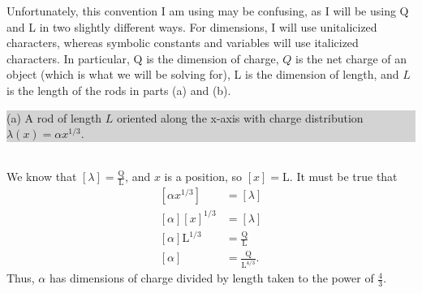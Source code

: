 \documentclass[]{article}
\newcommand{\excerpt}[1]{\colorbox{lightgray}{\parbox{14.8cm}{#1}} \\}
\begin{document}
Unfortunately, this convention I am using may be confusing, as I will be using Q and L in two slightly different ways. For dimensions, I will use unitalicized characters, whereas symbolic constants and variables will use italicized characters. In particular, Q is the dimension of charge, $Q$ is the net charge of an object (which is what we will be solving for), L is the dimension of length, and $L$ is the length of the rods in parts (a) and (b). \\
\excerpt{
(a) A rod of length $L$ oriented along the x-axis with charge distribution $\lambda (x) = \alpha x^{1/3}$.
}
We know that $[\lambda] = \frac{\text{Q}}{\text{L}}$, and $x$ is a position, so $[x]=\text{L}$. It must be true that
\[
\begin{split}
	\left[\alpha x^{1/3}\right] & = [\lambda] \\
	[\alpha] [x]^{1/3} & = [\lambda] \\
	[\alpha] \text{L}^{1/3} & = \frac{\text{Q}}{\text{L}} \\
	[\alpha] & = \frac{\text{Q}}{\text{L}^{4/3}}.
\end{split}
\]
Thus, $\alpha$ has dimensions of charge divided by length taken to the power of $\frac{4}{3}$.
\end{document}
